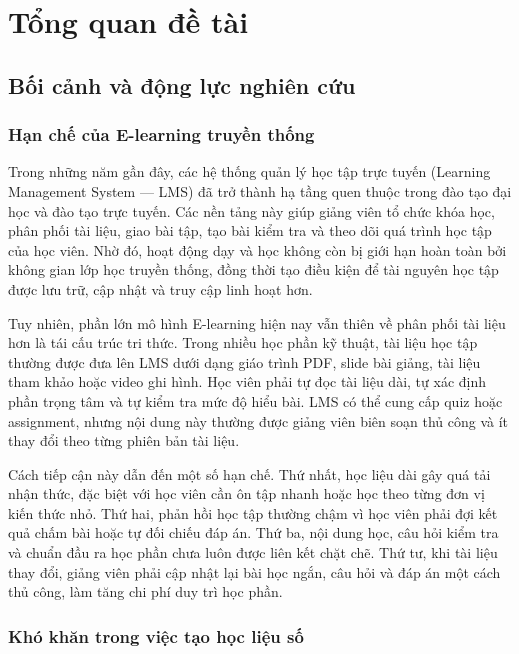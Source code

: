 \chapter{Tổng quan đề tài}

\section{Bối cảnh và động lực nghiên cứu}

\subsection{Hạn chế của E-learning truyền thống}

Trong những năm gần đây, các hệ thống quản lý học tập trực tuyến (Learning
Management System --- LMS) đã trở thành hạ tầng quen thuộc trong đào tạo đại
học và đào tạo trực tuyến. Các nền tảng này giúp giảng viên tổ chức khóa học,
phân phối tài liệu, giao bài tập, tạo bài kiểm tra và theo dõi quá trình học
tập của học viên. Nhờ đó, hoạt động dạy và học không còn bị giới hạn hoàn toàn
bởi không gian lớp học truyền thống, đồng thời tạo điều kiện để tài nguyên học
tập được lưu trữ, cập nhật và truy cập linh hoạt hơn.

Tuy nhiên, phần lớn mô hình E-learning hiện nay vẫn thiên về phân phối tài
liệu hơn là tái cấu trúc tri thức. Trong nhiều học phần kỹ thuật, tài liệu học
tập thường được đưa lên LMS dưới dạng giáo trình PDF, slide bài giảng, tài
liệu tham khảo hoặc video ghi hình. Học viên phải tự đọc tài liệu dài, tự xác
định phần trọng tâm và tự kiểm tra mức độ hiểu bài. LMS có thể cung cấp quiz
hoặc assignment, nhưng nội dung này thường được giảng viên biên soạn thủ công
và ít thay đổi theo từng phiên bản tài liệu.

Cách tiếp cận này dẫn đến một số hạn chế. Thứ nhất, học liệu dài gây quá tải
nhận thức, đặc biệt với học viên cần ôn tập nhanh hoặc học theo từng đơn vị
kiến thức nhỏ. Thứ hai, phản hồi học tập thường chậm vì học viên phải đợi kết
quả chấm bài hoặc tự đối chiếu đáp án. Thứ ba, nội dung học, câu hỏi kiểm tra
và chuẩn đầu ra học phần chưa luôn được liên kết chặt chẽ. Thứ tư, khi tài
liệu thay đổi, giảng viên phải cập nhật lại bài học ngắn, câu hỏi và đáp án
một cách thủ công, làm tăng chi phí duy trì học phần.

\subsection{Khó khăn trong việc tạo học liệu số}

